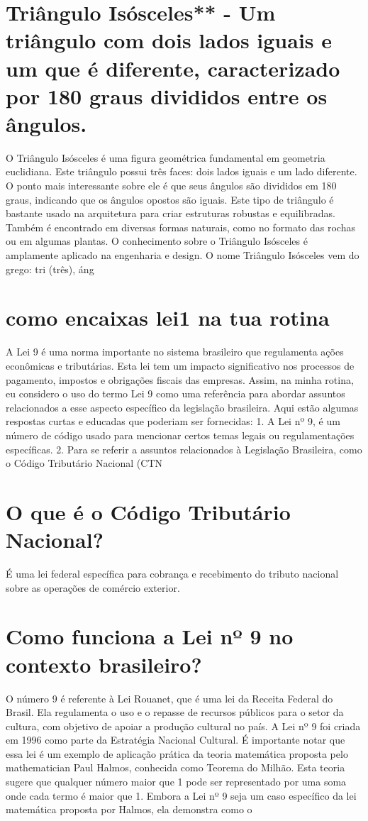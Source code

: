\documentclass[11pt,a4paper]{article}
\begin{document}
\section{Triângulo Isósceles** - Um triângulo com dois lados iguais e um que é diferente, caracterizado por 180 graus divididos entre os ângulos.}
O Triângulo Isósceles é uma figura geométrica fundamental em geometria euclidiana. Este triângulo possui três faces: dois lados iguais e um lado diferente. O ponto mais interessante sobre ele é que seus ângulos são divididos em 180 graus, indicando que os ângulos opostos são iguais. Este tipo de triângulo é bastante usado na arquitetura para criar estruturas robustas e equilibradas. Também é encontrado em diversas formas naturais, como no formato das rochas ou em algumas plantas. O conhecimento sobre o Triângulo Isósceles é amplamente aplicado na engenharia e design. O nome Triângulo Isósceles vem do grego: tri (três), áng

\section{como encaixas lei1 na tua rotina}
A Lei 9 é uma norma importante no sistema brasileiro que regulamenta ações econômicas e tributárias. Esta lei tem um impacto significativo nos processos de pagamento, impostos e obrigações fiscais das empresas. Assim, na minha rotina, eu considero o uso do termo Lei 9 como uma referência para abordar assuntos relacionados a esse aspecto específico da legislação brasileira. Aqui estão algumas respostas curtas e educadas que poderiam ser fornecidas: 1. A Lei nº 9, é um número de código usado para mencionar certos temas legais ou regulamentações específicas. 2. Para se referir a assuntos relacionados à Legislação Brasileira, como o Código Tributário Nacional (CTN

\section{O que é o Código Tributário Nacional?}
É uma lei federal específica para cobrança e recebimento do tributo nacional sobre as operações de comércio exterior.

\section{Como funciona a Lei nº 9 no contexto brasileiro?}
O número 9 é referente à Lei Rouanet, que é uma lei da Receita Federal do Brasil. Ela regulamenta o uso e o repasse de recursos públicos para o setor da cultura, com objetivo de apoiar a produção cultural no país. A Lei nº 9 foi criada em 1996 como parte da Estratégia Nacional Cultural. É importante notar que essa lei é um exemplo de aplicação prática da teoria matemática proposta pelo mathematician Paul Halmos, conhecida como Teorema do Milhão. Esta teoria sugere que qualquer número maior que 1 pode ser representado por uma soma onde cada termo é maior que 1. Embora a Lei nº 9 seja um caso específico da lei matemática proposta por Halmos, ela demonstra como o
\end{document}
